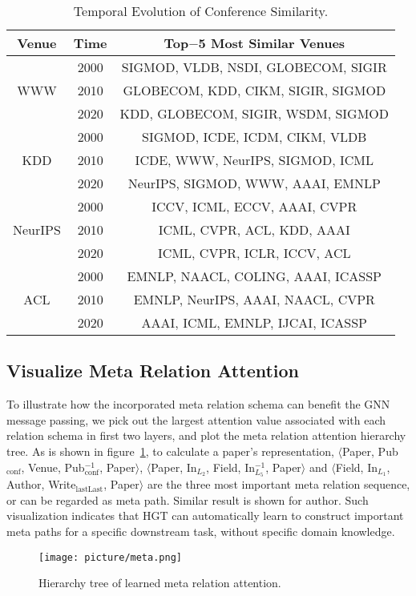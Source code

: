 \documentclass[sigconf]{acmart}
\theoremstyle{definition}
\begin{document}
{\begin{table}[th]
\centering
\begin{tabular}{ccc} 
\toprule
Venue & Time & Top$-$5 Most Similar Venues \\
\midrule
\multirow{3}{*}{WWW} & 2000 & SIGMOD, VLDB, NSDI, GLOBECOM, SIGIR\\
~& 2010 & GLOBECOM, KDD, CIKM, SIGIR, SIGMOD\\
~& 2020 & KDD, GLOBECOM, SIGIR, WSDM, SIGMOD\\
\midrule
\multirow{3}{*}{KDD} & 2000 & SIGMOD, ICDE, ICDM, CIKM, VLDB\\
~& 2010 & ICDE, WWW, NeurIPS, SIGMOD, ICML\\
~& 2020 & NeurIPS, SIGMOD, WWW, AAAI, EMNLP\\
\midrule
\multirow{3}{*}{NeurIPS} & 2000 & ICCV, ICML, ECCV, AAAI, CVPR\\
~& 2010 & ICML, CVPR, ACL, KDD, AAAI\\
~& 2020 & ICML, CVPR, ICLR, ICCV, ACL\\
\midrule
\multirow{3}{*}{ACL} & 2000 & EMNLP, NAACL, COLING, AAAI, ICASSP\\
~& 2010 & EMNLP, NeurIPS, AAAI, NAACL, CVPR\\
~& 2020 & AAAI, ICML, EMNLP, IJCAI, ICASSP\\
\bottomrule
\end{tabular}
\caption{Temporal Evolution of Conference Similarity.} 
\label{tab:case} 
\end{table}

\subsection{Visualize Meta Relation Attention}
To illustrate how the incorporated meta relation schema can benefit the GNN message passing, we pick out the largest attention value associated with each relation schema in first two layers, and plot the meta relation attention hierarchy tree. As is shown in figure~\ref{fig:meta}, to calculate a paper's representation, $\langle$Paper, Pub$_{\text{conf}}$, Venue, Pub$_{\text{conf}}^{-1}$, Paper$\rangle$, $\langle$Paper, In$_{L_2}$, Field, In$_{L_5}^{-1}$, Paper$\rangle$ and $\langle$Field, In$_{L_1}$, Author, Write$_{\text{lastLast}}$, Paper$\rangle$ are the three most important meta relation sequence, or can be regarded as meta path. Similar result is shown for author. Such visualization indicates that HGT can automatically learn to construct important meta paths for a specific downstream task, without specific domain knowledge.

 \begin{figure}[ht!]
    \centering
    \texttt{[image: picture/meta.png]}
    \caption{Hierarchy tree of learned meta relation attention.}
    \label{fig:meta}
\end{figure} 

}%
 
\end{document}
